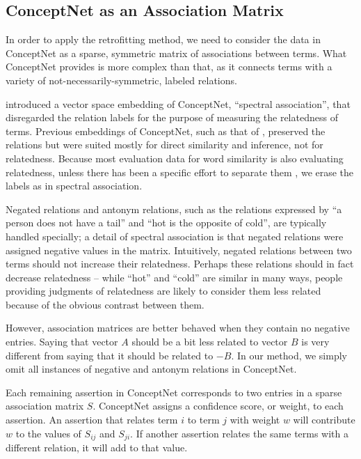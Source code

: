 \documentclass[letterpaper]{article}
\begin{document}
\subsection{ConceptNet as an Association Matrix}

In order to apply the retrofitting method, we need to consider the data in
ConceptNet as a sparse, symmetric matrix of associations between terms. What
ConceptNet provides is more complex than that, as it connects terms with a
variety of not-necessarily-symmetric, labeled relations.

 introduced a vector space embedding of ConceptNet,
``spectral association'', that disregarded the relation labels for the purpose
of measuring the relatedness of terms. Previous embeddings of ConceptNet, such
as that of , preserved the relations but were
suited mostly for direct similarity and inference, not for relatedness. Because
most evaluation data for word similarity is also evaluating relatedness, unless
there has been a specific effort to separate them \cite{agirre2009similarity},
we erase the labels as in spectral association.

Negated relations and antonym relations, such as the relations expressed by
``a person does not have a tail'' and ``hot is the opposite of cold'', are
typically handled specially; a detail of spectral association is that negated
relations were assigned negative values in the matrix. Intuitively, negated
relations between two terms should not increase their relatedness. Perhaps
these relations should in fact decrease relatedness -- while ``hot'' and
``cold'' are similar in many ways, people providing judgments of relatedness
are likely to consider them less related because of the obvious contrast
between them.

However, association matrices are better behaved when they contain no negative
entries. Saying that vector $A$ should be a bit less related to vector
$B$ is very different from saying that it should be related to $-B$.
In our method, we simply omit all instances of negative and antonym
relations in ConceptNet.

Each remaining assertion in ConceptNet corresponds to two entries in a sparse
association matrix $S$. ConceptNet assigns a confidence score, or weight, to
each assertion. An assertion that relates term $i$ to term $j$ with weight $w$
will contribute $w$ to the values of $S_{ij}$ and $S_{ji}$. If another
assertion relates the same terms with a different relation, it will add to that
value.
\end{document}

